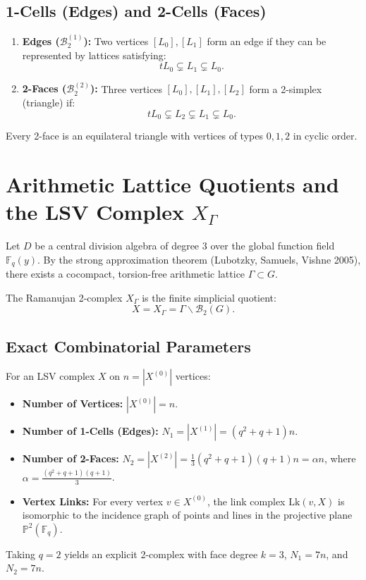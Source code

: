 \subsection{1-Cells (Edges) and 2-Cells (Faces)}
\begin{enumerate}
    \item \textbf{Edges ($\mathcal{B}_2^{(1)}$):} Two vertices $[L_0], [L_1]$ form an edge if they can be represented by lattices satisfying:
    \[
    t L_0 \subsetneq L_1 \subsetneq L_0.
    \]
    \item \textbf{2-Faces ($\mathcal{B}_2^{(2)}$):} Three vertices $[L_0], [L_1], [L_2]$ form a 2-simplex (triangle) if:
    \[
    t L_0 \subsetneq L_2 \subsetneq L_1 \subsetneq L_0.
    \]
\end{enumerate}
Every 2-face is an equilateral triangle with vertices of types $0, 1, 2$ in cyclic order.

\section{Arithmetic Lattice Quotients and the LSV Complex $X_\Gamma$}
Let $D$ be a central division algebra of degree 3 over the global function field $\mathbb{F}_q(y)$. By the strong approximation theorem (Lubotzky, Samuels, Vishne 2005), there exists a cocompact, torsion-free arithmetic lattice $\Gamma \subset G$.

\begin{definition}
The Ramanujan 2-complex $X_\Gamma$ is the finite simplicial quotient:
\[
X = X_\Gamma = \Gamma \backslash \mathcal{B}_2(G).
\]
\end{definition}

\subsection{Exact Combinatorial Parameters}
For an LSV complex $X$ on $n = |X^{(0)}|$ vertices:
\begin{itemize}
    \item \textbf{Number of Vertices:} $|X^{(0)}| = n$.
    \item \textbf{Number of 1-Cells (Edges):} $N_1 = |X^{(1)}| = (q^2 + q + 1) n$.
    \item \textbf{Number of 2-Faces:} $N_2 = |X^{(2)}| = \frac{1}{3}(q^2+q+1)(q+1) n = \alpha n$, where $\alpha = \frac{(q^2+q+1)(q+1)}{3}$.
    \item \textbf{Vertex Links:} For every vertex $v \in X^{(0)}$, the link complex $\mathrm{Lk}(v, X)$ is isomorphic to the incidence graph of points and lines in the projective plane $\mathbb{P}^2(\mathbb{F}_q)$.
\end{itemize}
Taking $q = 2$ yields an explicit 2-complex with face degree $k = 3$, $N_1 = 7n$, and $N_2 = 7n$.
